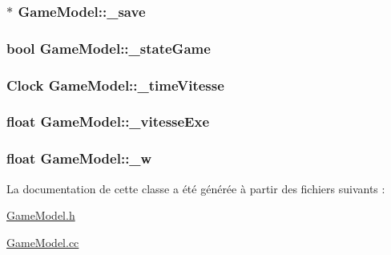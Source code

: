 \label{classGameModel_a30bd3e959cb1d952159c40bbf7f337ae}
\hypertarget{classGameModel_a598286d6b42e682fffa1811e7f0e6938}{
\subsubsection[{\_\-save}]{$\ast$ {\bf GameModel::\_\-save}}}
\label{classGameModel_a598286d6b42e682fffa1811e7f0e6938}
\hypertarget{classGameModel_a989ee76691c469ffc881408004679cf6}{
\subsubsection[{\_\-stateGame}]{\setlength{\rightskip}{0pt plus 5cm}bool {\bf GameModel::\_\-stateGame}}}
\label{classGameModel_a989ee76691c469ffc881408004679cf6}
\hypertarget{classGameModel_a88f9ec42a124ec6e541a13951bcf31d6}{
\subsubsection[{\_\-timeVitesse}]{\setlength{\rightskip}{0pt plus 5cm}Clock {\bf GameModel::\_\-timeVitesse}}}
\label{classGameModel_a88f9ec42a124ec6e541a13951bcf31d6}
\hypertarget{classGameModel_ae20f9b32b10a54e58f33aa6d2d484579}{
\subsubsection[{\_\-vitesseExe}]{\setlength{\rightskip}{0pt plus 5cm}float {\bf GameModel::\_\-vitesseExe}}}
\label{classGameModel_ae20f9b32b10a54e58f33aa6d2d484579}
\hypertarget{classGameModel_abd35ff8c3aced3bc352b03e5cc38ef63}{
\subsubsection[{\_\-w}]{\setlength{\rightskip}{0pt plus 5cm}float {\bf GameModel::\_\-w}}}
\label{classGameModel_abd35ff8c3aced3bc352b03e5cc38ef63}


La documentation de cette classe a été générée à partir des fichiers suivants :\begin{DoxyCompactItemize}
\item 
\hyperlink{GameModel_8h}{GameModel.h}\item 
\hyperlink{GameModel_8cc}{GameModel.cc}\end{DoxyCompactItemize}
